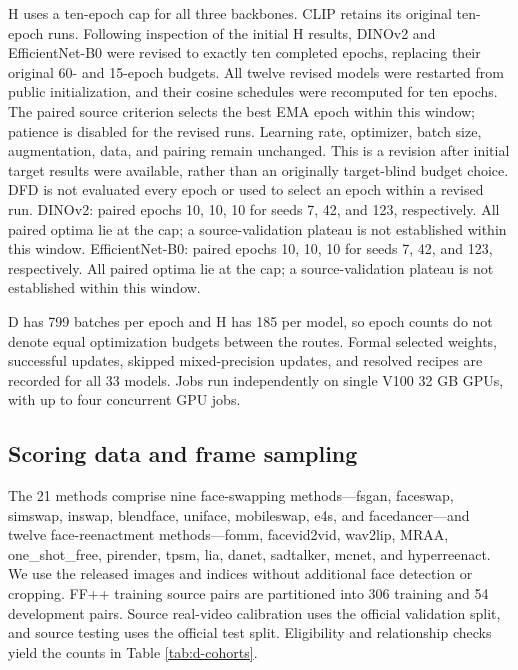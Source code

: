 \documentclass{ieeeaccess}
\begin{document}
H uses a ten-epoch cap for all three backbones. CLIP retains its
original ten-epoch runs. Following inspection of the initial H results,
DINOv2 and EfficientNet-B0 were revised to exactly ten completed epochs,
replacing their original 60- and 15-epoch budgets. All twelve revised
models were restarted from public initialization, and their cosine
schedules were recomputed for ten epochs. The paired source criterion
selects the best EMA epoch within this window; patience is disabled for
the revised runs. Learning rate, optimizer, batch size, augmentation,
data, and pairing remain unchanged. This is a revision after initial
target results were available, rather than an originally target-blind
budget choice. DFD is not evaluated every epoch or used to select an
epoch within a revised run. DINOv2: paired epochs 10, 10, 10 for seeds
7, 42, and 123, respectively. All paired optima lie at the cap; a
source-validation plateau is not established within this window.
EfficientNet-B0: paired epochs 10, 10, 10 for seeds 7, 42, and 123,
respectively. All paired optima lie at the cap; a source-validation
plateau is not established within this window.

D has 799 batches per epoch and H has 185 per model, so epoch counts do
not denote equal optimization budgets between the routes. Formal
selected weights, successful updates, skipped mixed-precision updates,
and resolved recipes are recorded for all 33 models. Jobs run
independently on single V100 32 GB GPUs, with up to four concurrent GPU
jobs.

\subsection{Scoring data and frame
sampling}\label{scoring-data-and-frame-sampling}

The 21 methods comprise nine face-swapping methods---fsgan, faceswap,
simswap, inswap, blendface, uniface, mobileswap, e4s, and
facedancer---and twelve face-reenactment methods---fomm, facevid2vid,
wav2lip, MRAA, one\_shot\_free, pirender, tpsm, lia, danet, sadtalker,
mcnet, and hyperreenact. We use the released images and indices without
additional face detection or cropping. FF++ training source pairs are
partitioned into 306 training and 54 development pairs. Source
real-video calibration uses the official validation split, and source
testing uses the official test split. Eligibility and relationship
checks yield the counts in Table \ref{tab:d-cohorts}.
\end{document}

